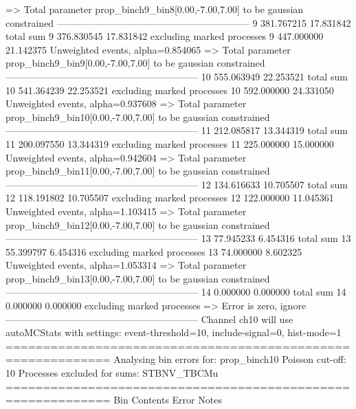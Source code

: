   => Total parameter prop_binch9_bin8[0.00,-7.00,7.00] to be gaussian constrained
------------------------------------------------------------
9          381.767215      17.831842       total sum                     
9          376.830545      17.831842       excluding marked processes    
9          447.000000      21.142375       Unweighted events, alpha=0.854065
  => Total parameter prop_binch9_bin9[0.00,-7.00,7.00] to be gaussian constrained
------------------------------------------------------------
10         555.063949      22.253521       total sum                     
10         541.364239      22.253521       excluding marked processes    
10         592.000000      24.331050       Unweighted events, alpha=0.937608
  => Total parameter prop_binch9_bin10[0.00,-7.00,7.00] to be gaussian constrained
------------------------------------------------------------
11         212.085817      13.344319       total sum                     
11         200.097550      13.344319       excluding marked processes    
11         225.000000      15.000000       Unweighted events, alpha=0.942604
  => Total parameter prop_binch9_bin11[0.00,-7.00,7.00] to be gaussian constrained
------------------------------------------------------------
12         134.616633      10.705507       total sum                     
12         118.191802      10.705507       excluding marked processes    
12         122.000000      11.045361       Unweighted events, alpha=1.103415
  => Total parameter prop_binch9_bin12[0.00,-7.00,7.00] to be gaussian constrained
------------------------------------------------------------
13         77.945233       6.454316        total sum                     
13         55.399797       6.454316        excluding marked processes    
13         74.000000       8.602325        Unweighted events, alpha=1.053314
  => Total parameter prop_binch9_bin13[0.00,-7.00,7.00] to be gaussian constrained
------------------------------------------------------------
14         0.000000        0.000000        total sum                     
14         0.000000        0.000000        excluding marked processes    
  => Error is zero, ignore      
------------------------------------------------------------
Channel ch10 will use autoMCStats with settings: event-threshold=10, include-signal=0, hist-mode=1
============================================================
Analysing bin errors for: prop_binch10
Poisson cut-off: 10
Processes excluded for sums: STBNV_TBCMu
============================================================
Bin        Contents        Error           Notes                         

